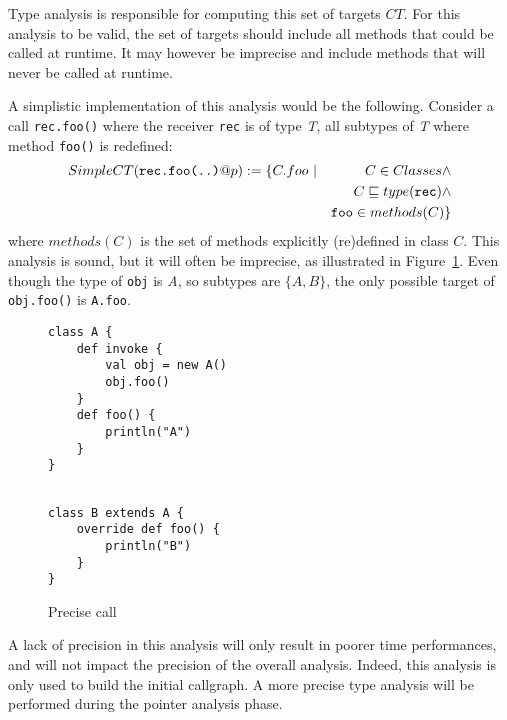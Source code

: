 Type analysis is responsible for computing this set of targets $CT$. For this
analysis to be valid, the set of targets should include all methods that could
be called at runtime. It may however be imprecise and include methods that will
never be called at runtime.

A simplistic implementation of this analysis would be the following. Consider a
call \lstinline{rec.foo()} where the receiver \lstinline{rec} is of type
\emph{T}, all subtypes of \emph{T} where method \lstinline{foo()} is redefined:
\begin{eqnarray*}
        SimpleCT(\verb/rec.foo(..)/@p) := \{C.foo ~ &|& C \in Classes \land \\
        && C \subtypeeq type(\verb/rec/) \land \\
        && \verb/foo/ \in methods(C) \}
\end{eqnarray*}
where $methods(C)$ is the set of methods explicitly (re)defined in class $C$.
This analysis is sound,
but it will often be imprecise, as illustrated in
Figure~\ref{fig:ta:example2}. Even though the type of \lstinline{obj} is
\emph{A}, so subtypes are $\{A, B\}$, the only possible target of
\lstinline{obj.foo()} is \lstinline{A.foo}.

\begin{figure}[h]
    \centering

\begin{minipage}[tl]{0.6\linewidth}
    \centering
\lstset{linewidth=0.6\linewidth}
\begin{lstlisting}
class A {
    def invoke {
        val obj = new A()
        obj.foo()
    }
    def foo() {
        println("A")
    }
}
\end{lstlisting}
\end{minipage}
\begin{minipage}[tl]{0.6\linewidth}
    \centering
\lstset{linewidth=0.6\linewidth}
\begin{lstlisting}

class B extends A {
    override def foo() {
        println("B")
    }
}
\end{lstlisting}
\end{minipage}
    \caption{Precise call}
    \label{fig:ta:example2}
\end{figure}

A lack of precision in this analysis will only result in poorer time
performances, and will not impact the precision of the overall analysis.
Indeed, this analysis is only used to build the initial callgraph. A more
precise type analysis will be
performed during the pointer analysis phase. 

